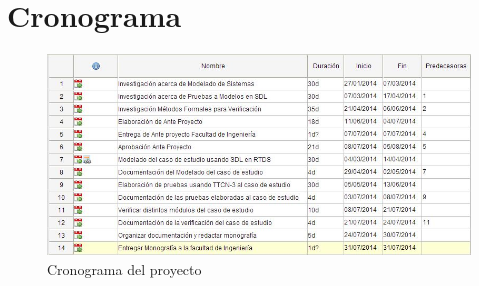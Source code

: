 \section{Cronograma}

\begin{figure}[!h]
  \centering
  \includegraphics[scale=0.6]{./images/Cronograma.jpg}
  \caption{Cronograma del proyecto}
  \label{fig:cronograma}
\end{figure}